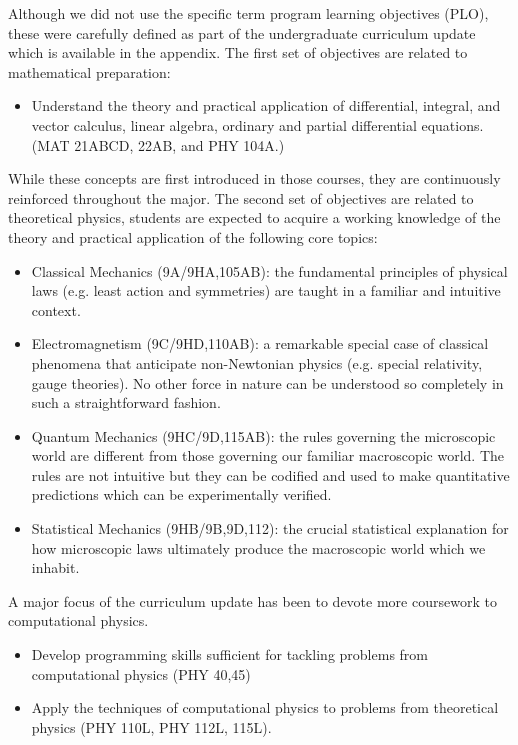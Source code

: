 \documentclass[12pt]{article}
\begin{document}
\noindent
Although we did not use the specific term program learning objectives (PLO), these were carefully defined as part of the undergraduate curriculum update which is available in the appendix.  The first set of objectives are related to mathematical preparation:
\begin{itemize}
\item Understand the theory and practical application of differential, integral, and vector calculus, linear algebra, ordinary and partial differential equations.  (MAT 21ABCD, 22AB, and PHY 104A.)
\end{itemize}
While these concepts are first introduced in those courses, they are continuously reinforced throughout the major.  The second set of objectives are related to theoretical physics, students are expected to acquire a working knowledge of the theory and practical application of the following core topics:
\begin{itemize}
 \item Classical Mechanics (9A/9HA,105AB): the fundamental principles of physical laws
  (e.g. least action and symmetries) are taught in a familiar and intuitive context. 
\item Electromagnetism (9C/9HD,110AB): a remarkable special case of classical
  phenomena that anticipate non-Newtonian physics (e.g. special
  relativity, gauge theories).  No other force in nature can be understood so
  completely in such a straightforward fashion.  
\item Quantum Mechanics (9HC/9D,115AB): the rules governing the microscopic world are
  different from those governing our familiar macroscopic world.  The
  rules are not intuitive but they can be codified and used to make
  quantitative predictions which can be experimentally verified.
\item Statistical Mechanics (9HB/9B,9D,112): the crucial statistical explanation for how
  microscopic laws ultimately produce the macroscopic world which we inhabit.
\end{itemize}
A major focus of the curriculum update has been to devote more coursework to computational physics.
\begin{itemize}
 \item Develop programming skills sufficient for tackling problems from computational physics (PHY 40,45)
 \item Apply the techniques of computational physics to problems from theoretical physics (PHY 110L, PHY 112L, 115L).
\end{itemize}
\end{document}
